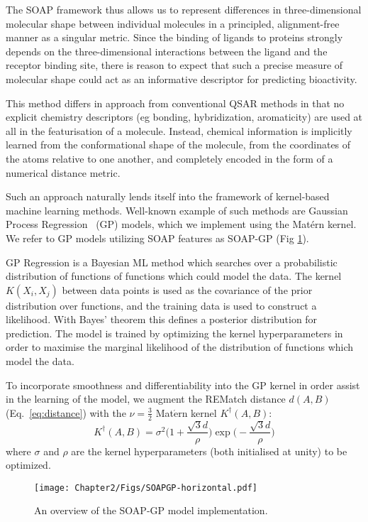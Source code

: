 The SOAP framework thus allows us to represent differences in three-dimensional molecular shape between individual molecules in a principled, alignment-free manner as a singular metric. Since the binding of ligands to proteins strongly depends on the three-dimensional interactions between the ligand and the receptor binding site, there is reason to expect that such a precise measure of molecular shape could act as an informative descriptor for predicting bioactivity.

This method differs in approach from conventional QSAR methods in that no explicit chemistry descriptors (eg bonding, hybridization, aromaticity) are used at all in the featurisation of a molecule. Instead, chemical information is implicitly learned from the conformational shape of the molecule, from the coordinates of the atoms relative to one another, and completely encoded in the form of a numerical distance metric.

Such an approach naturally lends itself into the framework of kernel-based machine learning methods. Well-known example of such methods are Gaussian Process Regression~\cite{rasmussen2005gp} (GP) models, which we implement using the Mat{\'e}rn kernel. We refer to GP models utilizing SOAP features as SOAP-GP (Fig \ref{fig:soapgp}). 

GP Regression is a Bayesian ML method which searches over a probabilistic distribution of functions of functions which could model the data. The kernel $K(X_{i},X_{j})$ between data points is used as the covariance of the prior distribution over functions, and the training data is used to construct a likelihood. With Bayes' theorem this defines a posterior distribution for prediction. The model is trained by optimizing the kernel hyperparameters in order to maximise the marginal likelihood of the distribution of functions which model the data. 

To incorporate smoothness and differentiability into the GP kernel in order assist in the learning of the model, we augment the REMatch distance $d(A,B)$ (Eq.~\ref{eq:distance}) with the $\nu=\frac{3}{2}$ Mat$\acute{\textrm{e}}$rn kernel $K^{\dagger}(A,B)$:
\begin{equation}
    K^{\dagger}(A,B) = \sigma^{2}\Big( 1+\frac{\sqrt{3}d}{\rho}\Big)\exp{\Big(-\frac{\sqrt{3}d}{\rho}\Big)}
\end{equation}
where $\sigma$ and $\rho$ are the kernel hyperparameters (both initialised at unity) to be optimized. 

\begin{figure}[!h] %
\centering
\texttt{[image: Chapter2/Figs/SOAPGP-horizontal.pdf]}
\caption{\label{fig:soapgp} An overview of the SOAP-GP model implementation.}
\end{figure}

